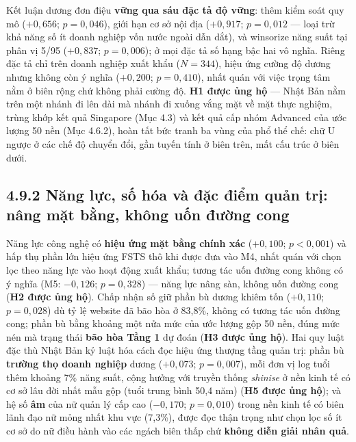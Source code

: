 \documentclass[
  a4paper,
  13pt]{extreport}
\begin{document}
Kết luận dương đơn điệu \textbf{vững qua sáu đặc tả độ vững}: thêm kiểm
soát quy mô (\(+0{,}656\); \(p = 0{,}046\)), giới hạn cơ sở nội địa
(\(+0{,}917\); \(p = 0{,}012\) --- loại trừ khả năng số ít doanh nghiệp
vốn nước ngoài dẫn dắt), và winsorize năng suất tại phân vị 5/95
(\(+0{,}837\); \(p = 0{,}006\)); ở mọi đặc tả số hạng bậc hai vô nghĩa.
Riêng đặc tả chỉ trên doanh nghiệp xuất khẩu (\(N = 344\)), hiệu ứng
cường độ dương nhưng không còn ý nghĩa (\(+0{,}200\); \(p = 0{,}410\)),
nhất quán với việc trọng tâm nằm ở biên rộng chứ không phải cường độ.
\textbf{H1 được ủng hộ} --- Nhật Bản nằm trên một nhánh đi lên dài mà
nhánh đi xuống vắng mặt về mặt thực nghiệm, trùng khớp kết quả Singapore
(Mục 4.3) và kết quả cấp nhóm Advanced của ước lượng 50 nền (Mục 4.6.2),
hoàn tất bức tranh ba vùng của phổ thể chế: chữ U ngược ở các chế độ
chuyển đổi, gần tuyến tính ở biên trên, mất cấu trúc ở biên dưới.

\hypertarget{nux103ng-lux1ef1c-sux1ed1-huxf3a-vuxe0-ux111ux1eb7c-ux111iux1ec3m-quux1ea3n-trux1ecb-nuxe2ng-mux1eb7t-bux1eb1ng-khuxf4ng-uux1ed1n-ux111ux1b0ux1eddng-cong}{%
\subsection{4.9.2 Năng lực, số hóa và đặc điểm quản trị: nâng mặt bằng,
không uốn đường
cong}\label{nux103ng-lux1ef1c-sux1ed1-huxf3a-vuxe0-ux111ux1eb7c-ux111iux1ec3m-quux1ea3n-trux1ecb-nuxe2ng-mux1eb7t-bux1eb1ng-khuxf4ng-uux1ed1n-ux111ux1b0ux1eddng-cong}}

Năng lực công nghệ có \textbf{hiệu ứng mặt bằng chính xác}
(\(+0{,}100\); \(p < 0{,}001\)) và hấp thụ phần lớn hiệu ứng FSTS thô
khi được đưa vào M4, nhất quán với chọn lọc theo năng lực vào hoạt động
xuất khẩu; tương tác uốn đường cong không có ý nghĩa (M5: \(-0{,}126\);
\(p = 0{,}328\)) --- năng lực nâng sàn, không uốn đường cong (\textbf{H2
được ủng hộ}). Chấp nhận số giữ phần bù dương khiêm tốn (\(+0{,}110\);
\(p = 0{,}028\)) dù tỷ lệ website đã bão hòa ở 83,8\%, không có tương
tác uốn đường cong; phần bù bằng khoảng một nửa mức của ước lượng gộp 50
nền, đúng mức nén mà trạng thái \textbf{bão hòa Tầng 1} dự đoán
(\textbf{H3 được ủng hộ}). Hai quy luật đặc thù Nhật Bản kỷ luật hóa
cách đọc hiệu ứng thượng tầng quản trị: phần bù \textbf{trường thọ doanh
nghiệp} dương (\(+0{,}073\); \(p = 0{,}007\)), mỗi đơn vị log tuổi thêm
khoảng 7\% năng suất, cộng hưởng với truyền thống \emph{shinise} ở nền
kinh tế có cơ sở lâu đời nhất mẫu gộp (tuổi trung bình 50,4 năm)
(\textbf{H5 được ủng hộ}); và hệ số \textbf{âm} của nữ quản lý cấp cao
(\(-0{,}170\); \(p = 0{,}010\)) trong nền kinh tế có biên lãnh đạo nữ
mỏng nhất khu vực (7,3\%), được đọc thận trọng như chọn lọc số ít cơ sở
do nữ điều hành vào các ngách biên thấp chứ \textbf{không diễn giải nhân
quả}.
\end{document}
